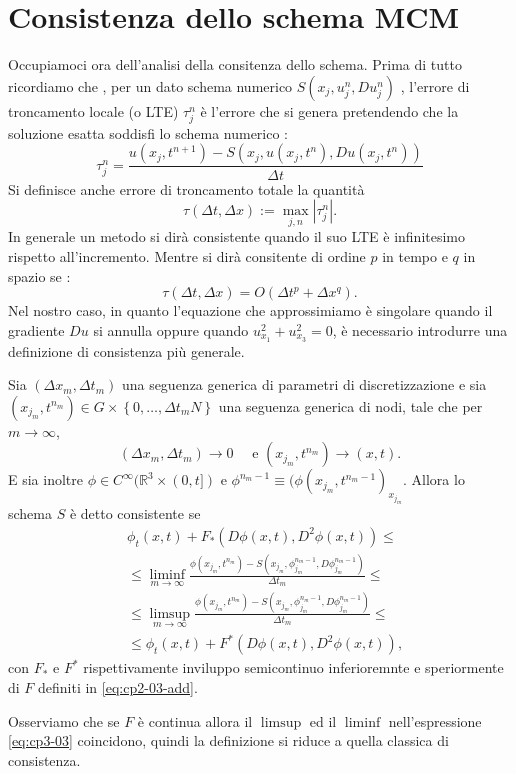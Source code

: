 \section{Consistenza dello schema MCM}
\label{sec:cp3-sc2}
Occupiamoci ora dell'analisi della consitenza dello schema. Prima di tutto ricordiamo che , per un dato schema numerico $S(x_j,u_j^n,Du_j^n)$ , l'errore di troncamento locale (o LTE) $\tau_j^n$ è l'errore che si genera pretendendo che la soluzione esatta soddisfi lo schema numerico :
\[
\tau_j^n=\frac{u(x_j,t^{n+1})-S(x_j,u(x_j,t^n),Du(x_j,t^n))}{\Delta t}
\]
Si definisce anche errore di troncamento totale la quantità
\[
\tau(\Delta t,\Delta x) := \max_{j,n} |\tau_j^n|.
\]
In generale un metodo si dirà consistente quando il suo LTE è infinitesimo rispetto all'incremento. Mentre si dirà consitente di ordine $p$ in tempo e $q$ in spazio se :
\[
\tau(\Delta t,\Delta x) = O(\Delta t^p +\Delta x^q).
\] 
Nel nostro caso, in quanto l'equazione che approssimiamo è singolare quando il gradiente  $Du$ si annulla oppure quando $u_{x_1}^2+u_{x_3}^2=0$, è necessario introdurre una definizione di consistenza più generale.
\begin{definizione}
Sia $(\Delta x_m,\Delta t_m)$ una seguenza generica di parametri di discretizzazione e sia $(x_{j_m},t^{n_m})\in G\times\left\{0,\dots,\Delta t_mN\right\}$ una seguenza generica di nodi, tale che per $m\to\infty$,
\[
(\Delta x_m,\Delta t_m)\to0 \quad\text{ e } (x_{j_m},t^{n_m})\to(x,t).
\]
E sia inoltre $\phi\in C^{\infty}(\mathbb{R}^3\times(0,t])$ e $\phi^{n_m-1}\equiv(\phi(x_{j_m},t^{n_m-1})_{x_{j_m}}$. Allora lo schema $S$ è detto consistente se
\begin{equation}
\label{eq:cp3-03}
\begin{split}
&\phi_t(x,t)+F_*(D\phi(x,t),D^2\phi(x,t))\le \\
&\le\liminf_{m\to\infty}\frac{\phi(x_{j_m},t^{n_m})-S(x_{j_m},\phi_{j_m}^{n_m-1},D\phi_{j_m}^{n_m-1})}{\Delta t_m}\le \\
&\le\limsup_{m\to\infty}\frac{\phi(x_{j_m},t^{n_m})-S(x_{j_m},\phi_{j_m}^{n_m-1},D\phi_{j_m}^{n_m-1})}{\Delta t_m}\le \\
&\le\phi_t(x,t)+F^*(D\phi(x,t),D^2\phi(x,t)),
\end{split}
\end{equation}
con $F_*$ e $F^*$ rispettivamente inviluppo semicontinuo inferioremnte
e speriormente di $F$ definiti in \eqref{eq:cp2-03-add}.
\end{definizione}
\begin{osservazione}
Osserviamo che se $F$ è continua allora il $\limsup$ ed il $\liminf$ nell'espressione \eqref{eq:cp3-03} coincidono, quindi la definizione si riduce a quella classica di consistenza.
\end{osservazione}


